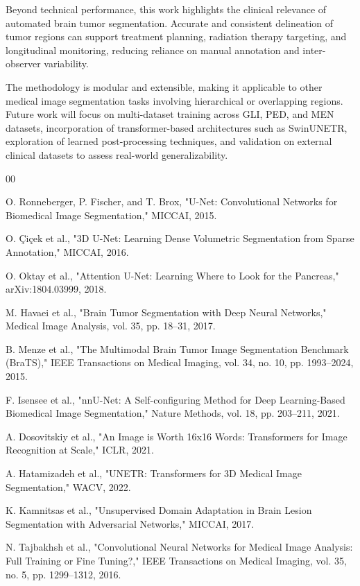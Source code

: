 \documentclass[conference]{IEEEtran}
\begin{document}
Beyond technical performance, this work highlights the clinical relevance of automated brain tumor segmentation. Accurate and consistent delineation of tumor regions can support treatment planning, radiation therapy targeting, and longitudinal monitoring, reducing reliance on manual annotation and inter-observer variability.

The methodology is modular and extensible, making it applicable to other medical image segmentation tasks involving hierarchical or overlapping regions. Future work will focus on multi-dataset training across GLI, PED, and MEN datasets, incorporation of transformer-based architectures such as SwinUNETR, exploration of learned post-processing techniques, and validation on external clinical datasets to assess real-world generalizability.


\begin{thebibliography}{00}

O. Ronneberger, P. Fischer, and T. Brox,
"U-Net: Convolutional Networks for Biomedical Image Segmentation,"
MICCAI, 2015.

O. Çiçek et al.,
"3D U-Net: Learning Dense Volumetric Segmentation from Sparse Annotation,"
MICCAI, 2016.

O. Oktay et al.,
"Attention U-Net: Learning Where to Look for the Pancreas,"
arXiv:1804.03999, 2018.

M. Havaei et al.,
"Brain Tumor Segmentation with Deep Neural Networks,"
Medical Image Analysis, vol. 35, pp. 18--31, 2017.

B. Menze et al.,
"The Multimodal Brain Tumor Image Segmentation Benchmark (BraTS),"
IEEE Transactions on Medical Imaging, vol. 34, no. 10, pp. 1993--2024, 2015.

F. Isensee et al.,
"nnU-Net: A Self-configuring Method for Deep Learning-Based Biomedical Image Segmentation,"
Nature Methods, vol. 18, pp. 203--211, 2021.

A. Dosovitskiy et al.,
"An Image is Worth 16x16 Words: Transformers for Image Recognition at Scale,"
ICLR, 2021.

A. Hatamizadeh et al.,
"UNETR: Transformers for 3D Medical Image Segmentation,"
WACV, 2022.

K. Kamnitsas et al.,
"Unsupervised Domain Adaptation in Brain Lesion Segmentation with Adversarial Networks,"
MICCAI, 2017.

N. Tajbakhsh et al.,
"Convolutional Neural Networks for Medical Image Analysis: Full Training or Fine Tuning?,"
IEEE Transactions on Medical Imaging, vol. 35, no. 5, pp. 1299--1312, 2016.


\end{thebibliography}
\end{document}
